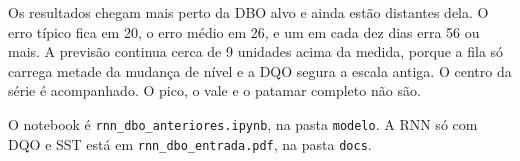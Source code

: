 \documentclass[11pt,a4paper]{article}
\begin{document}
Os resultados chegam mais perto da DBO alvo e ainda estão distantes dela. O erro típico fica em 20, o erro médio em 26, e um em cada dez dias erra 56 ou mais. A previsão continua cerca de 9 unidades acima da medida, porque a fila só carrega metade da mudança de nível e a DQO segura a escala antiga. O centro da série é acompanhado. O pico, o vale e o patamar completo não são.

O notebook é \texttt{rnn\_dbo\_anteriores.ipynb}, na pasta \texttt{modelo}. A RNN só com DQO e SST está em \texttt{rnn\_dbo\_entrada.pdf}, na pasta \texttt{docs}.
\end{document}
